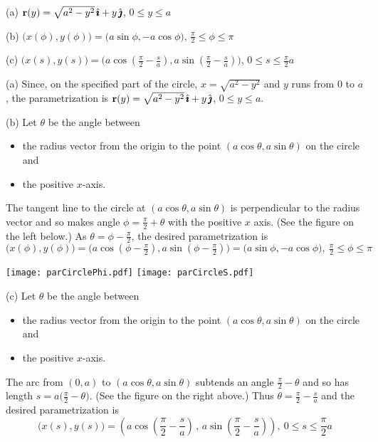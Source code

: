 \begin{answer} 
(a) $\mathbf{r}(y)=\sqrt{a^2-y^2}\,\hat{\pmb{\imath}}+ y\,\hat{\pmb{\jmath}}$, $0\le y\le a$

(b) $\big(x(\phi),y(\phi)\big)
       =\big(a\sin \phi ,-a\cos \phi \big)$,
   $\frac{\pi}{2}\le\phi\le\pi$

(c) $\big(x(s),y(s)\big)
    =\big(a\cos(\tfrac{\pi}{2}-\frac{s}{a}),
           a\sin(\tfrac{\pi}{2}-\tfrac{s}{a})\big)$,
   $0\le s\le\tfrac{\pi}{2}a$
\end{answer}

\begin{solution} 
(a) 
Since, on the specified part of the  circle, 
$x=\sqrt{a^2-y^2}$ and  $y$ runs from $0$ to $a$, 
the parametrization is
$\mathbf{r}(y)=\sqrt{a^2-y^2}\,\hat{\pmb{\imath}}+ y\,\hat{\pmb{\jmath}}$, $0\le y\le a$.

(b) Let $\theta$ be the angle between 
\begin{itemize}\itemsep1pt \parskip0pt 
\item the radius vector from the origin to the point 
$(a\cos\theta,a\sin\theta)$  on the circle and 
\item
the positive $x$-axis. 
\end{itemize}
The tangent line to the circle at $(a\cos\theta,a\sin\theta)$ 
is perpendicular to the radius vector and so makes angle $\phi=\frac{\pi}{2}+\theta$ with the positive $x$ axis.
(See the figure on the left below.)
As $\theta =\phi-\frac{\pi}{2}$, the desired parametrization is
\begin{equation*}
\big(x(\phi),y(\phi)\big)
=\big(a\cos(\phi-\tfrac{\pi}{2}),a\sin(\phi-\tfrac{\pi}{2})\big)
=\big(a\sin \phi ,-a\cos \phi \big),\ 
  \tfrac{\pi}{2}\le\phi\le\pi
\end{equation*}

\begin{center}
       \texttt{[image: parCirclePhi.pdf]}\quad
       \texttt{[image: parCircleS.pdf]}
\end{center}


(c) Let $\theta$ be the angle between 
\begin{itemize}\itemsep1pt \parskip0pt 
\item the radius vector from the origin to the point 
$(a\cos\theta,a\sin\theta)$  on the circle and 
\item
the positive $x$-axis. 
\end{itemize} 
The arc from $(0,a)$ to $(a\cos\theta,a\sin\theta)$ 
subtends an angle $\frac{\pi}{2}-\theta$ and so
has length $s=a\big(\frac{\pi}{2}-\theta\big)$. (See the figure
on the right above.) Thus $\theta=\frac{\pi}{2}-\frac{s}{a}$
and the desired parametrization is
\begin{equation*}
\big(x(s),y(s)\big)
=\left(a\cos\left(\frac{\pi}{2}-\frac{s}{a}\right)\,,\,
           a\sin\left(\frac{\pi}{2}-\frac{s}{a}\right)\right)
,\ 0\le s\le\frac{\pi}{2}a
\end{equation*}
\end{solution}


